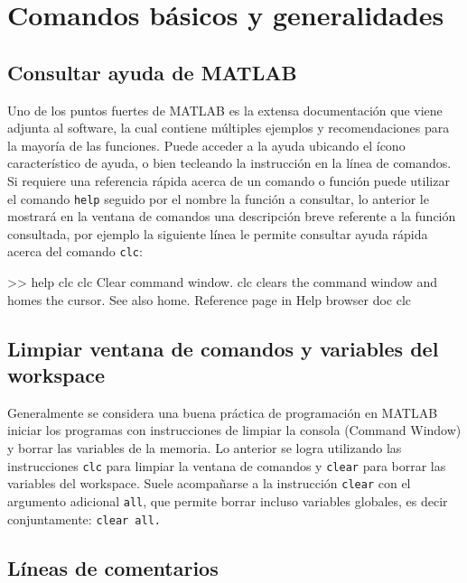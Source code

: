 \section{Comandos básicos y generalidades}

\subsection{Consultar ayuda de MATLAB}

Uno de los puntos fuertes de MATLAB es la extensa documentación que
viene adjunta al software, la cual contiene múltiples ejemplos y
recomendaciones para la mayoría de las funciones. Puede acceder a la
ayuda ubicando el ícono característico de ayuda, o bien tecleando la
instrucción  en la línea de comandos.\\

Si requiere una referencia rápida acerca de un comando o función puede
utilizar el comando \texttt{help} seguido por el nombre la función a
consultar, lo anterior le mostrará en la ventana de comandos una
descripción breve referente a la función consultada, por ejemplo la
siguiente línea le permite consultar ayuda rápida acerca del comando
\texttt{clc}:

\begin{matlab}
>> help clc
    clc    Clear command window.
    clc clears the command window and homes the cursor.
    See also home.
    Reference page in Help browser
    doc clc
\end{matlab}

\subsection{Limpiar ventana de comandos y variables del workspace}

Generalmente se considera una buena práctica de programación en MATLAB
iniciar los programas con instrucciones de limpiar la consola (Command
Window) y borrar las variables de la memoria. Lo anterior se logra
utilizando las instrucciones \texttt{clc} para limpiar la ventana de
comandos y \texttt{clear} para borrar las variables del workspace. Suele
acompañarse a la instrucción \texttt{clear} con el argumento adicional
\texttt{all}, que permite borrar incluso variables globales, es decir
conjuntamente: \texttt{clear all.}

\subsection{Líneas de comentarios}

